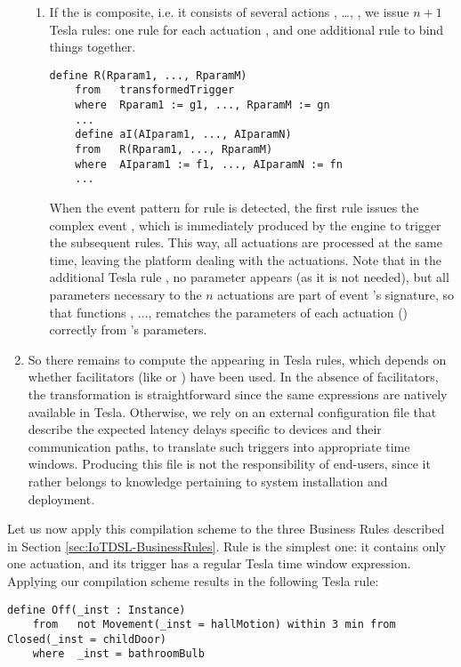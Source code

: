 \begin{enumerate}
\begin{enumerate}
		\item If the  is composite, i.e. it consists of several actions , \ldots, , we issue $n+1$ Tesla rules: one rule for each actuation , and one additional rule to bind things together.
		\begin{center}
			\begin{lstlisting}[language=tesla, numbers=none]
	define R(Rparam1, ..., RparamM)
	from   transformedTrigger
	where  Rparam1 := g1, ..., RparamM := gn
	...
	define aI(AIparam1, ..., AIparamN)
	from   R(Rparam1, ..., RparamM)
	where  AIparam1 := f1, ..., AIparamN := fn
	...
			\end{lstlisting}
		\end{center}
		When the event pattern for rule  is detected, the first rule issues the complex event , which is immediately produced by the \CEP engine to trigger the subsequent rules. This way, all actuations are processed at the same time, leaving the platform dealing with the actuations. Note that in the additional Tesla rule , no  parameter appears (as it is not needed), but all parameters necessary to the $n$ actuations are part of event 's signature, so that functions , ...,  rematches the parameters of each actuation () correctly from 's parameters.
	\end{enumerate}

	\item So there remains to compute the  appearing in Tesla rules, which depends on whether facilitators (like  or ) have been used. In the absence of facilitators, the transformation is straightforward since the same expressions are natively available in Tesla. Otherwise, we rely on an external configuration file that describe the expected latency delays specific to devices and their communication paths, to translate such triggers into appropriate time windows. Producing this file is not the responsibility of end-users, since it rather belongs to knowledge pertaining to \IOT system installation and deployment.
\end{enumerate}

Let us now apply this compilation scheme to the three Business Rules described in Section \ref{sec:IoTDSL-BusinessRules}. Rule  is the simplest one: it contains only one actuation, and its trigger has a regular Tesla time window expression. Applying our compilation scheme results in the following Tesla rule:
\begin{lstlisting}[language=tesla, numbers=none]
	define Off(_inst : Instance)
	from   not Movement(_inst = hallMotion) within 3 min from Closed(_inst = childDoor)
	where  _inst = bathroomBulb
\end{lstlisting}

